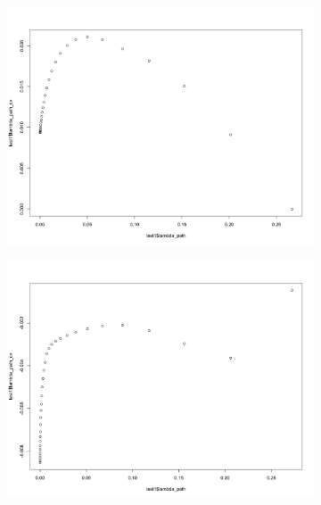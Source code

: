 \documentclass[letterpaper]{article}
\begin{document}
\begin{figure}[H]
\centering
\begin{subfigure}{0.5\textwidth}
  \centering
  \includegraphics[width=1\linewidth]{./result_plot/fix_k/7wrong_path_plot}
\end{subfigure}%
\begin{subfigure}{.5\textwidth}
  \centering
  \includegraphics[width=1\linewidth]{./result_plot/fix_k/8wrong_path_plot}
\end{subfigure}

\end{figure}
\end{document}
